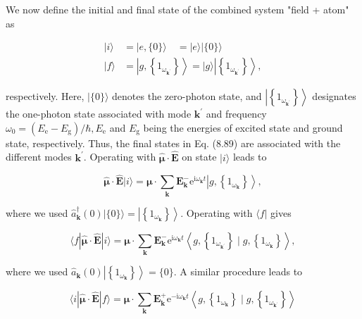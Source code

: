\documentclass[10pt]{article}
\begin{document}
We now define the initial and final state of the combined system "field + atom" as


\begin{align*}
|i\rangle & =|e,\{0\}\rangle \quad=|e\rangle|\{0\}\rangle  \tag{8.95}\\
|f\rangle & =\left|g,\left\{1_{\omega_{\mathbf{k}^{\prime}}}\right\}\right\rangle=|g\rangle\left|\left\{1_{\omega_{\mathbf{k}^{\prime}}}\right\}\right\rangle, \tag{8.96}
\end{align*}


respectively. Here, $|\{0\}\rangle$ denotes the zero-photon state, and $\left|\left\{1_{\omega_{\mathbf{k}^{\prime}}}\right\}\right\rangle$ designates the one-photon state associated with mode $\mathbf{k}^{\prime}$ and frequency $\omega_{0}=\left(E_{\mathrm{e}}-E_{\mathrm{g}}\right) / \hbar, E_{\mathrm{e}}$ and $E_{\mathrm{g}}$ being the energies of excited state and ground state, respectively. Thus, the final states in Eq. (8.89) are associated with the different modes $\mathbf{k}^{\prime}$. Operating with $\hat{\boldsymbol{\mu}} \cdot \hat{\mathbf{E}}$ on state $|i\rangle$ leads to


\begin{equation*}
\hat{\boldsymbol{\mu}} \cdot \hat{\mathbf{E}}|i\rangle=\boldsymbol{\mu} \cdot \sum_{\mathbf{k}} \mathbf{E}_{\mathbf{k}}^{-} \mathrm{e}^{\mathrm{i} \omega_{\mathbf{k}} t}\left|g,\left\{1_{\omega_{\mathbf{k}}}\right\}\right\rangle, \tag{8.97}
\end{equation*}


where we used $\hat{a}_{\mathbf{k}}^{\dagger}(0)|\{0\}\rangle=\left|\left\{1_{\omega_{\mathbf{k}}}\right\}\right\rangle$. Operating with $\langle f|$ gives


\begin{equation*}
\langle f| \hat{\boldsymbol{\mu}} \cdot \hat{\mathbf{E}}|i\rangle=\boldsymbol{\mu} \cdot \sum_{\mathbf{k}} \mathbf{E}_{\mathbf{k}}^{-} \mathrm{e}^{\mathrm{i} \omega_{\mathbf{k}} t}\left\langle g,\left\{1_{\omega_{\mathbf{k}^{\prime}}}\right\} \mid g,\left\{1_{\omega_{\mathbf{k}}}\right\}\right\rangle, \tag{8.98}
\end{equation*}


where we used $\hat{a}_{\mathbf{k}}(0)\left|\left\{1_{\omega_{\mathbf{k}}}\right\}\right\rangle=\{0\}$. A similar procedure leads to


\begin{equation*}
\langle i| \hat{\boldsymbol{\mu}} \cdot \hat{\mathbf{E}}|f\rangle=\boldsymbol{\mu} \cdot \sum_{\mathbf{k}} \mathbf{E}_{\mathbf{k}}^{+} \mathrm{e}^{-\mathrm{i} \omega_{\mathbf{k}} t}\left\langle g,\left\{1_{\omega_{\mathbf{k}}}\right\} \mid g,\left\{1_{\omega_{\mathbf{k}^{\prime}}}\right\}\right\rangle \tag{8.99}
\end{equation*}
\end{document}
